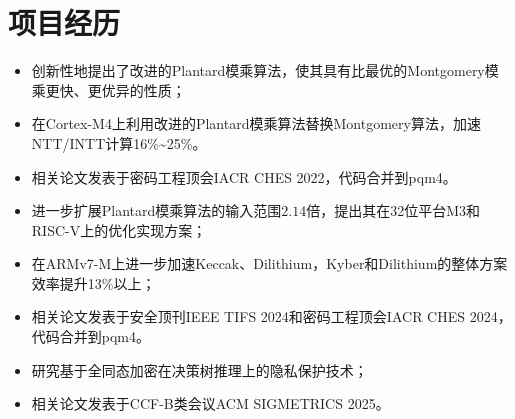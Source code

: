\documentclass[UTF8,AutoFakeBold]{resume}
\begin{document}
\section{\hspace{0.25em}\makebox[0.75em][c]{\faGithub} \fangsong\textbf{项目经历}}
    \begin{itemize}
      \item \kaishu 创新性地提出了改进的Plantard模乘算法，使其具有比最优的Montgomery模乘更快、更优异的性质；
      \item \kaishu 在Cortex-M4上利用改进的Plantard模乘算法替换Montgomery算法，加速NTT/INTT计算16\%\textasciitilde 25\%。
      \item \kaishu 相关论文发表于密码工程顶会IACR CHES 2022，代码合并到pqm4。
    \end{itemize}
    \begin{itemize}
      \item \kaishu 进一步扩展Plantard模乘算法的输入范围$2.14$倍，提出其在32位平台M3和RISC-V上的优化实现方案；
      \item \kaishu 在ARMv7-M上进一步加速Keccak、Dilithium，Kyber和Dilithium的整体方案效率提升13\%以上；
      \item \kaishu 相关论文发表于安全顶刊IEEE TIFS 2024和密码工程顶会IACR CHES 2024，代码合并到pqm4。
    \end{itemize}
    \begin{itemize}
        \item \kaishu 研究基于全同态加密在决策树推理上的隐私保护技术；
        \item \kaishu 相关论文发表于CCF-B类会议ACM SIGMETRICS 2025。
    \end{itemize}

\vspace{2mm}
\end{document}
